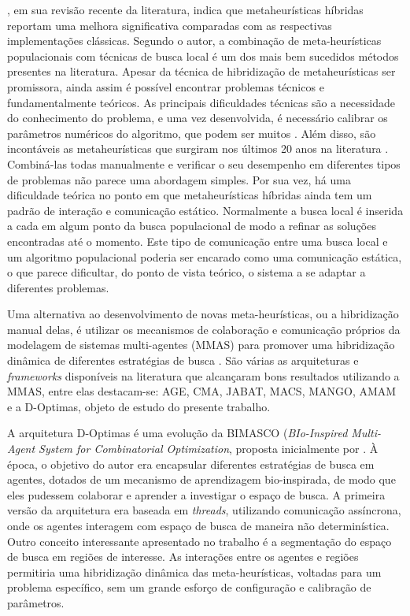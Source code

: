 , em sua revisão recente da literatura, indica que metaheurísticas híbridas reportam uma melhora significativa comparadas com as respectivas implementações clássicas. Segundo o autor, a combinação de meta-heurísticas populacionais com técnicas de busca local é um dos mais bem sucedidos métodos presentes na literatura. Apesar da técnica de hibridização de metaheurísticas ser promissora, ainda assim é possível encontrar problemas técnicos e fundamentalmente teóricos. As principais dificuldades técnicas são a necessidade do conhecimento do problema, e uma vez desenvolvida, é necessário calibrar os parâmetros numéricos do algoritmo, que podem ser muitos \cite{stutzle2018}. Além disso, são incontáveis as metaheurísticas que surgiram nos últimos 20 anos na literatura \cite{dokeroglu2019}. Combiná-las todas manualmente e verificar o seu desempenho em diferentes tipos de problemas não parece uma abordagem simples. Por sua vez, há uma dificuldade teórica no ponto em que metaheurísticas híbridas ainda tem um padrão de interação e comunicação estático. Normalmente a busca local é inserida a cada em algum ponto da busca populacional de modo a refinar as soluções encontradas até o momento. Este tipo de comunicação entre uma busca local e um algoritmo populacional poderia ser encarado como uma comunicação estática, o que parece dificultar, do ponto de vista teórico, o sistema a se adaptar a diferentes problemas.

Uma alternativa ao desenvolvimento de novas meta-heurísticas, ou a hibridização manual delas, é utilizar os mecanismos de colaboração e comunicação próprios da modelagem de sistemas multi-agentes (MMAS) para promover uma hibridização dinâmica de diferentes estratégias de busca \cite{gong2015, zheng2015, fernandes2009, milano2004}. São várias as arquiteturas e \textit{frameworks} disponíveis na literatura que alcançaram bons resultados utilizando a MMAS, entre elas destacam-se: AGE, CMA, JABAT, MACS, MANGO, AMAM \cite{silva2018} e a D-Optimas, objeto de estudo do presente trabalho.

A arquitetura D-Optimas é uma evolução da BIMASCO (\textit{BIo-Inspired Multi-Agent System for Combinatorial Optimization}, proposta inicialmente por . À época, o objetivo do autor era encapsular diferentes estratégias de busca em agentes, dotados de um mecanismo de aprendizagem bio-inspirada, de modo que eles pudessem colaborar e aprender a investigar o espaço de busca. A primeira versão da arquitetura era baseada em \textit{threads}, utilizando comunicação assíncrona, onde os agentes interagem com espaço de busca de maneira não determinística. Outro conceito interessante apresentado no trabalho é a segmentação do espaço de busca em regiões de interesse. 
As interações entre os agentes e regiões permitiria uma hibridização dinâmica das meta-heurísticas, voltadas para um problema específico, sem um grande esforço de configuração e calibração de parâmetros.

